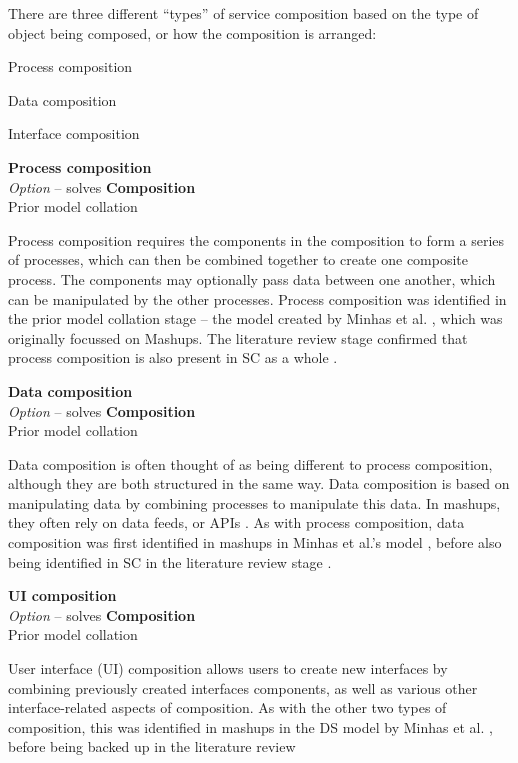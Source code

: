 There are three different ``types'' of service composition based on the type of object being composed, or how the composition is arranged:
\begin{itemize*}
	\item Process composition
	\item Data composition
	\item Interface composition
\end{itemize*}

\textbf{Process composition} \\ \emph{Option} -- solves \textbf{Composition} \\ Prior model collation \cite{Minhas2012,Daniel2007}

Process composition requires the components in the composition to form a series of processes, which can then be combined together to create one composite process. The components may optionally pass data between one another, which can be manipulated by the other processes. Process composition was identified in the prior model collation stage -- the model created by Minhas et al. \cite{Minhas2012}, which was originally focussed on Mashups. The literature review stage confirmed that process composition is also present in SC as a whole \cite{Daniel2007}.

\textbf{Data composition} \\ \emph{Option} -- solves \textbf{Composition} \\ Prior model collation \cite{Minhas2012,Daniel2007}

Data composition is often thought of as being different to process composition, although they are both structured in the same way. Data composition is based on manipulating data by combining processes to manipulate this data. In mashups, they often rely on data feeds, or APIs \cite{Minhas2012}. As with process composition, data composition was first identified in mashups in Minhas et al.'s model \cite{Minhas2012}, before also being identified in SC in the literature review stage \cite{Daniel2007}.

\textbf{UI composition} \\ \emph{Option} -- solves \textbf{Composition} \\ Prior model collation \cite{Minhas2012,Daniel2007}

User interface (UI) composition allows users to create new interfaces by combining previously created interfaces components, as well as various other interface-related aspects of composition. As with the other two types of composition, this was identified in mashups in the DS model by Minhas et al. \cite{Minhas2012}, before being backed up in the literature review \cite{Daniel2007}

